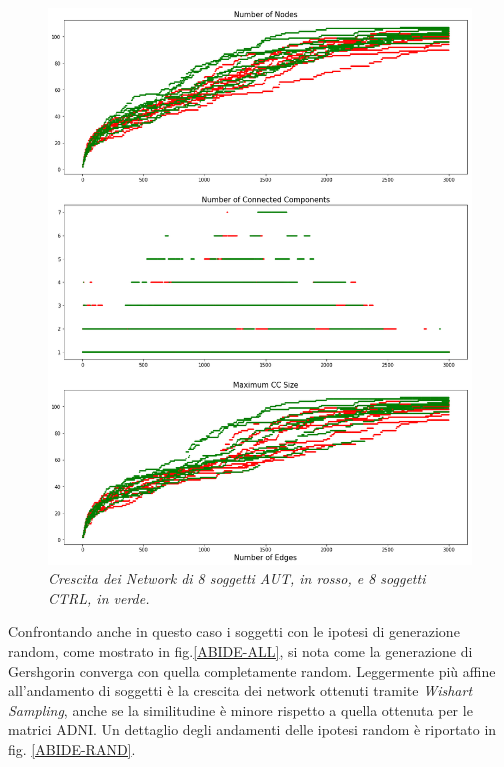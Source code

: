 \documentclass[12pt,openright,a4paper]{article}
\begin{document}
\begin{figure}[!h]
\centering
\includegraphics[scale=0.4]{ABIDE-Network-growth}
\caption{\textit{Crescita dei Network di 8 soggetti AUT, in rosso, e 8 soggetti CTRL, in verde.}}
\label{ABIDE-CTRLAUT}
\end{figure}

Confrontando anche in questo caso i soggetti con le ipotesi di generazione random, come mostrato in fig.\ref{ABIDE-ALL}, si nota come la generazione di Gershgorin converga con quella completamente random. Leggermente più affine all'andamento di soggetti è la crescita dei network ottenuti tramite \textit{Wishart Sampling}, anche se la similitudine è minore rispetto a quella ottenuta per le matrici ADNI. Un dettaglio degli andamenti delle ipotesi random è riportato in fig. \ref{ABIDE-RAND}.
\end{document}
